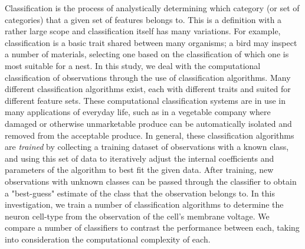Classification is the process of analystically determining which category (or set of categories) that a given set of features belongs to. This is a definition with a rather large scope and classification itself has many variations. For example, classification is a basic trait shared between many organisms; a bird may inspect a number of materials, selecting one based on the classification of which one is most suitable for a nest. In this study, we deal with the computational classification of observations through the use of classification algorithms. Many different classification algorithms exist, each with different traits and suited for different feature sets. These computational classification systems are in use in many applications of everyday life, such as in a vegetable company where damaged or otherwise unmarketable produce can be automatically isolated and removed from the acceptable produce. In general, these classification algorithms are \emph{trained} by collecting a training dataset of observations with a known class, and using this set of data to iteratively adjust the internal coefficients and parameters of the algorithm to best fit the given data. After training, new observations with unknown classes can be passed through the classifier to obtain a "best-guess" estimate of the class that the observation belongs to. In this investigation, we train a number of classification algorithms to determine the neuron cell-type from the observation of the cell's membrane voltage. We compare a number of classifiers to contrast the performance between each, taking into consideration the computational complexity of each.

\par


